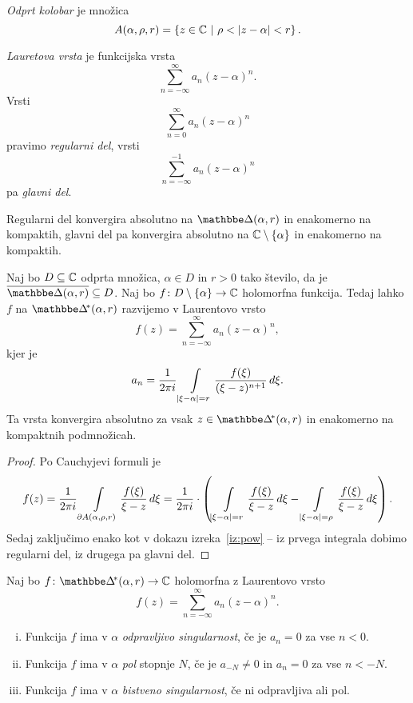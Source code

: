 \begin{definicija}
\emph{Odprt kolobar} je množica
\[
A(\alpha, \rho, r) = \left\{z \in \mathbb{C}~\middle\vert~\rho < \left\lvert z - \alpha\right\rvert < r\right\}.
\]
\end{definicija}

\begin{definicija}
\emph{Lauretova vrsta} je funkcijska vrsta
\[
\sum_{n=-\infty}^\infty a_n (z - \alpha)^n.
\]
Vrsti
\[
\sum_{n=0}^\infty a_n (z - \alpha)^n
\]
pravimo \emph{regularni del}, vrsti
\[
\sum_{n=-\infty}^{-1} a_n (z - \alpha)^n
\]
pa \emph{glavni del}.
\end{definicija}

\begin{opomba}
Regularni del konvergira absolutno na $\dsk(\alpha, r)$ in
enakomerno na kompaktih, glavni del pa konvergira absolutno na
$\mathbb{C} \setminus \left\{\alpha\right\}$ in enakomerno na kompaktih.
\end{opomba}

\begin{izrek}\label{iz:lau}
Naj bo $D \subseteq \mathbb{C}$ odprta množica, $\alpha \in D$ in $r > 0$
tako število, da je $\oline{\dsk(\alpha, r)} \subseteq D$. Naj bo
$f \colon D \setminus \left\{\alpha\right\} \to \mathbb{C}$ holomorfna funkcija.
Tedaj lahko $f$ na $\dskx(\alpha, r)$ razvijemo v Laurentovo vrsto
\[
f(z) = \sum_{n=-\infty}^\infty a_n (z - \alpha)^n,
\]
kjer je
\[
a_n = \frac{1}{2 \pi i} \int\limits_{\left\lvert \xi - \alpha\right\rvert = r}
\frac{f(\xi)}{(\xi - z)^{n+1}}\,d\xi.
\]
Ta vrsta konvergira absolutno za vsak $z \in \dskx(\alpha, r)$ in
enakomerno na kompaktnih podmnožicah. 
\end{izrek}

\begin{proof}
Po Cauchyjevi formuli je
\[
f(z) =
\frac{1}{2 \pi i} \int\limits_{\partial A(\alpha, \rho, r)}
\frac{f(\xi)}{\xi - z}\,d\xi =
\frac{1}{2 \pi i} \cdot \left(
\int\limits_{\left\lvert \xi - \alpha\right\rvert = r} \frac{f(\xi)}{\xi - z}\,d\xi -
\int\limits_{\left\lvert \xi - \alpha\right\rvert = \rho} \frac{f(\xi)}{\xi - z}\,d\xi
\right).
\]
Sedaj zaključimo enako kot v dokazu izreka~\ref{iz:pow} -- iz
prvega integrala dobimo regularni del, iz drugega pa glavni del.
\end{proof}

\begin{definicija}
Naj bo $f \colon \dskx(\alpha, r) \to \C$ holomorfna z Laurentovo
vrsto
\[
f(z) = \sum_{n=-\infty}^\infty a_n (z - \alpha)^n.
\]

\begin{enumerate}[i)]
\item Funkcija $f$ ima v $\alpha$
\emph{odpravljivo singularnost}, če
je $a_n = 0$ za vse $n < 0$.
\item Funkcija $f$ ima v $\alpha$
\emph{pol} stopnje $N$, če je
$a_{-N} \ne 0$ in $a_n = 0$ za vse $n < -N$.
\item Funkcija $f$ ima v $\alpha$
\emph{bistveno singularnost}, če ni
odpravljiva ali pol.
\end{enumerate}
\end{definicija}

